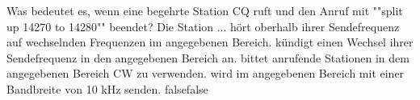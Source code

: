     {Was bedeutet es, wenn eine begehrte Station CQ ruft und den Anruf mit ""split up 14270 to 14280"" beendet? Die Station ...}
    {hört oberhalb ihrer Sendefrequenz auf wechselnden Frequenzen im angegebenen Bereich.}
    {kündigt einen Wechsel ihrer Sendefrequenz in den angegebenen Bereich an.}
    {bittet anrufende Stationen in dem angegebenen Bereich CW zu verwenden.}
    {wird im angegebenen Bereich mit einer Bandbreite von 10 kHz senden.}
    {false}{false}